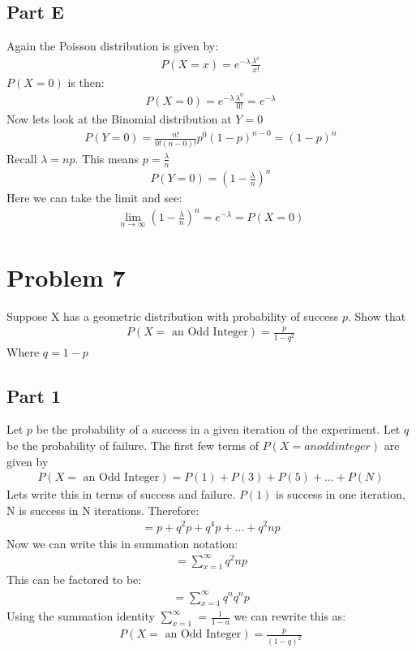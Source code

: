 \documentclass{article}
\begin{document}
\subsection*{Part E}
Again the Poisson distribution is given by:
\begin{align*}
P(X=x) = e^{-\lambda} \frac{\lambda^x}{x!}
\end{align*}
$P(X=0)$ is then:
\begin{align*}
P(X=0) = e^{-\lambda} \frac{\lambda^0}{0!} = e^{-\lambda}
\end{align*}
Now lets look at the Binomial distribution at $Y=0$
\begin{align*}
P(Y=0) = \frac{n!}{0! (n-0)!} p^0 (1-p)^{n-0} = (1-p)^{n}
\end{align*}
Recall $\lambda = np$. This means $p=\frac{\lambda}{n}$
\begin{align*}
P(Y=0) = (1-\frac{\lambda}{n})^{n}
\end{align*}
Here we can take the limit and see:
\begin{align*}
\boxed{ \lim_{n\rightarrow \infty} (1-\frac{\lambda}{n})^{n} = e^{-\lambda} = P(X=0) }
\end{align*}
\clearpage

\section*{Problem 7}
Suppose X has a geometric distribution with probability of success $p$. Show that 
\begin{align*}
P(X=\text{ an Odd Integer}) = \frac{p}{1-q^2}
\end{align*}
Where $q=1-p$
\subsection*{Part 1}
Let $p$ be the probability of a success in a given iteration of the experiment. Let $q$ be the probability of failure.
The first few terms of $P(X=an odd integer)$ are given by
\begin{align*}
P(X=\text{ an Odd Integer}) = P(1) +P(3) + P(5) +...+P(N)
\end{align*}
Lets write this in terms of success and failure. $P(1)$ is success in one iteration, N is success in N iterations. Therefore:
\begin{align*}
 = p + q^2 p + q^4 p +...+q^2n p
\end{align*}
Now we can write this in summation notation:
\begin{align*}
 = \sum_{x=1}^{\infty} q^2n p
\end{align*}
This can be factored to be:
\begin{align*}
 = \sum_{x=1}^{\infty} q^n q^n p
\end{align*}
Using the summation identity $\sum_{x=1}^{\infty}$ = $\frac{1}{1-a}$ we can rewrite this as:
\begin{align*}
\boxed{ P(X=\text{ an Odd Integer}) = \frac{p}{(1-q)^2} }
\end{align*}
\clearpage
\end{document}
